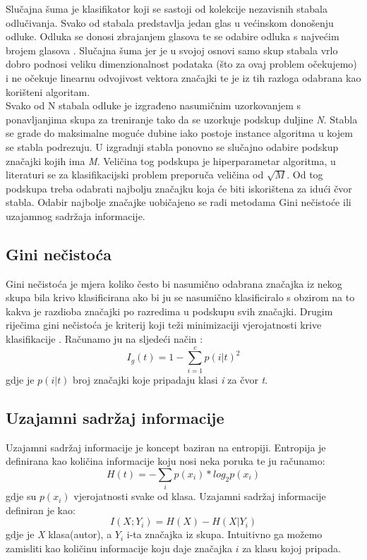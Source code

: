 Slučajna šuma \cite{breiman} je klasifikator koji se sastoji od kolekcije nezavisnih stabala odlučivanja. Svako od stabala predstavlja jedan glas u većinskom donošenju odluke. Odluka se donosi zbrajanjem glasova te se odabire odluka s najvećim brojem glasova \cite{rfdef}. Slučajna šuma jer je u svojoj osnovi samo skup stabala vrlo dobro podnosi veliku dimenzionalnost podataka (što za ovaj problem očekujemo) i ne očekuje linearnu odvojivost vektora značajki te je iz tih razloga odabrana kao korišteni algoritam.  \\
	
	Svako od N stabala odluke je izgrađeno nasumičnim uzorkovanjem s ponavljanjima skupa za treniranje tako da se uzorkuje podskup duljine \textit{N}. Stabla se grade do maksimalne moguće dubine iako postoje instance algoritma u kojem se stabla podrezuju. U izgradnji stabla ponovno se slučajno odabire podskup značajki kojih ima \textit{M}. Veličina tog podskupa je hiperparametar algoritma, u literaturi \cite{statisticallearning} se za klasifikacijski problem preporuča veličina od $\sqrt{M}$. Od tog podskupa treba odabrati najbolju značajku koja će biti iskorištena za idući čvor stabla. Odabir najbolje značajke uobičajeno se radi metodama Gini nečistoće ili uzajamnog sadržaja informacije.
	
\subsection{Gini nečistoća}

Gini nečistoća je mjera koliko često bi nasumično odabrana značajka iz nekog skupa bila krivo klasificirana ako bi ju se nasumično klasificiralo s obzirom na to kakva je razdioba značajki po razredima u podskupu svih značajki. Drugim riječima gini nečistoća je kriterij koji teži minimizaciji vjerojatnosti krive klasifikacije \cite{cse}. Računamo ju na sljedeći način \cite{gidef}:
\begin{equation}
	I_g(t) = 1 -  \sum_{i=1}^{c} p(i | t)^{2}
\end{equation}
gdje je $p(i | t)$ broj značajki koje pripadaju klasi \textit{i} za čvor \textit{t}. 

\subsection{Uzajamni sadržaj informacije} \label{entropy}

Uzajamni sadržaj informacije je koncept baziran na entropiji. Entropija je definirana kao količina informacije koju nosi neka poruka te ju računamo:
\begin{equation}
		H(t) = - \sum_{i} p(x_{i}) * log_2 p(x_{i})
\end{equation}
gdje su $p(x_{i})$ vjerojatnosti svake od klasa. \newline
Uzajamni sadržaj informacije definiran je kao:
\begin{equation}
		I(X;Y_{i}) = H(X) - H(X | Y_{i})
\end{equation}
gdje je \textit{X} klasa(autor), a $Y_{i}$ i-ta značajka iz skupa. Intuitivno ga možemo zamisliti kao količinu informacije koju daje značajka $i$ za klasu kojoj pripada.

